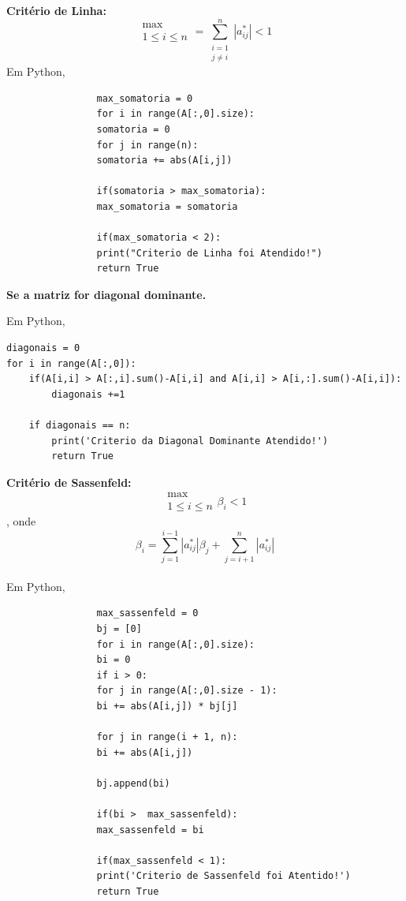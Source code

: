 \documentclass[
12pt,				%
openright,			%
twoside,			%
a4paper,			%
english,			%
french,				%
spanish,			%
brazil				%
]{abntex2_new}
\begin{document}
		
		\begin{alineas}
			\item{\textbf{Critério de Linha:}
				$$\substack{\max \\ 1 \leq i \leq n} = \sum_{\substack{i = 1 \\ j \neq i}}^{n}
				|a_{ij}^{*} | < 1 $$
				Em Python,
				\begin{lstlisting}
				max_somatoria = 0
				for i in range(A[:,0].size):
				somatoria = 0
				for j in range(n):
				somatoria += abs(A[i,j])
				
				if(somatoria > max_somatoria):
				max_somatoria = somatoria
				
				if(max_somatoria < 2): 
				print("Criterio de Linha foi Atendido!")
				return True\end{lstlisting}
			}
			
			\item{\textbf{Se a matriz for diagonal dominante.}
				
				Em Python,
				\begin{lstlisting}
diagonais = 0
for i in range(A[:,0]):
	if(A[i,i] > A[:,i].sum()-A[i,i] and A[i,i] > A[i,:].sum()-A[i,i]):
		diagonais +=1
				
	if diagonais == n:
		print('Criterio da Diagonal Dominante Atendido!')
		return True
				\end{lstlisting}
				
				
				
			}
			\item{\textbf{Critério de Sassenfeld:}
				$$\substack{\max \\ 1 \leq i \leq n}  \beta_i < 1 $$\hspace{25pt}, onde
				$$\beta_i = \sum_{j=1}^{i-1} |a_{ij}^{*} | \beta_j + \sum_{j = i + 1}^{n}  |
				a_{ij}^{*}|$$\\
				
				Em Python,
				\begin{lstlisting}
				max_sassenfeld = 0
				bj = [0]
				for i in range(A[:,0].size):
				bi = 0
				if i > 0:
				for j in range(A[:,0].size - 1):
				bi += abs(A[i,j]) * bj[j]
				
				for j in range(i + 1, n):
				bi += abs(A[i,j])
				
				bj.append(bi)
				
				if(bi >  max_sassenfeld):
				max_sassenfeld = bi
				
				if(max_sassenfeld < 1):
				print('Criterio de Sassenfeld foi Atentido!')
				return True\end{lstlisting}  
			}
		\end{alineas}
		
\end{document}
